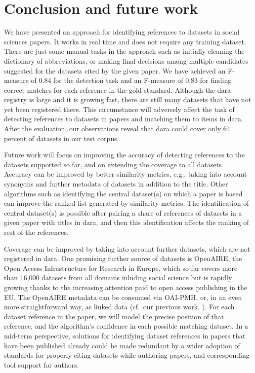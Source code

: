 \documentclass{IOS-Book-Article}
\newcommand{\dara}{\textsf{da\textbar ra}}
\begin{document}
\section{Conclusion and future work}
\label{sec:future}
We have presented an approach for identifying references to datasets in social sciences papers.
It works in real time and does not require any training dataset.
There are just some manual tasks in the approach such as initially cleaning the dictionary of abbreviations, or making final decisions among multiple candidates suggested for the datasets cited by the given paper.
We have achieved an F-measure of 0.84 for the detection task and an F-measure of 0.83 for finding correct matches for each reference in the gold standard.  
Although the {\dara} registry is large and it is growing fast, there are still many datasets that have not yet been registered there. 
This circumstance will adversely affect the task of detecting references to datasets in papers and matching them to items in {\dara}.
After the evaluation, our observations reveal that {\dara} could cover only 64 percent of datasets in our test corpus. 

Future work will focus on improving the accuracy of detecting references to the datasets supported so far, and on extending the coverage to all datasets.
Accuracy can be improved by better similarity metrics, e.g., taking into account synonyms and further metadata of datasets in addition to the title.
Other algorithms such as identifying the central dataset(s) on which a paper is based can improve the ranked list generated by similarity metrics.
The identification of central dataset(s) is possible after pairing a share of references of datasets in a given paper with titles in {\dara}, and then this identification affects the ranking of rest of the references. 

Coverage can be improved by 
taking into account further datasets, which are not registered in {\dara}.
One promising further source of datasets is OpenAIRE, the Open Access Infrastructure for Research in Europe, which so far covers more than 16,000 datasets from all domains inluding social science but is rapidly growing thanks to the increasing attention paid to open access publishing in the EU.
The OpenAIRE metadata can be consumed via OAI-PMH, or, in an even more straightforward way, as linked data (cf.\ our previous work, \citet{VahdatiEtAl:MappingResearchMetadata15}).
For each dataset reference in the paper, we will model the precise position of that reference, and the algorithm's confidence in each possible matching dataset.
In a mid-term perspective, solutions for identifying dataset references in papers that have been published already could be made redundant by a wider adoption of 
standards for properly citing datasets while authoring papers, and corresponding tool support for authors.
\end{document}
